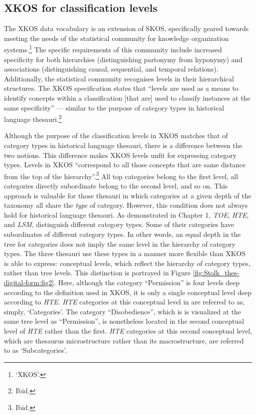 \subsection{XKOS for classification levels}
\label{sect:Stolk_thes-digital-form:xkos}
The XKOS data vocabulary is an extension of SKOS, specifically geared towards meeting the needs of the statistical community for knowledge organization systems.\footnote{`XKOS'.}  %
The specific requirements of this community include increased specificity for both hierarchies (distinguishing partonymy from hyponymy) and associations (distinguishing causal, sequential, and temporal relations). Additionally, the statistical community recognises levels in their hierarchical structures. The XKOS specification states that ``levels are used as a means to identify concepts within a classification [that are] used to classify instances at the same specificity'' --- similar to the purpose of category types in historical language thesauri.\footnote{Ibid.}

Although the purpose of the classification levels in XKOS matches that of category types in historical language thesauri, there is a difference between the two notions. This difference makes XKOS levels unfit for expressing category types. Levels in XKOS ``correspond to all those concepts that are same distance from the top of the hierarchy''.\footnote{Ibid.} All top categories belong to the first level, all categories directly subordinate belong to the second level, and so on. This approach is valuable for those thesauri in which categories at a given depth of the taxonomy all share the \textit{type} of category. However, this condition does not always hold for historical language thesauri. As demonstrated in Chapter 1, \textit{TOE}, \textit{HTE}, and \textit{LSM}, distinguish different category types. Some of their categories have subordinates of different category types. In other words, an equal depth in the tree for categories does not imply the same level in the hierarchy of category types. The three thesauri use these types in a manner more flexible than XKOS is able to express: conceptual levels, which reflect the hierarchy of category types, rather than tree levels. This distinction is portrayed in Figure \ref{fig:Stolk_thes-digital-form:fig2}. Here, although the category ``Permission'' is four levels deep according to the definition used in XKOS, it is only a single conceptual level deep according to \textit{HTE}. \textit{HTE} categories at this conceptual level in are referred to as, simply, `Categories'. The category ``Disobedience'', which is  is visualized at the same tree level as ``Permission'', is nonetheless located in the second conceptual level of \textit{HTE} rather than the first. \textit{HTE} categories at this second conceptual level, which are thesaurus microstructure rather than its macrostructure, are referred to as `Subcategories'.

